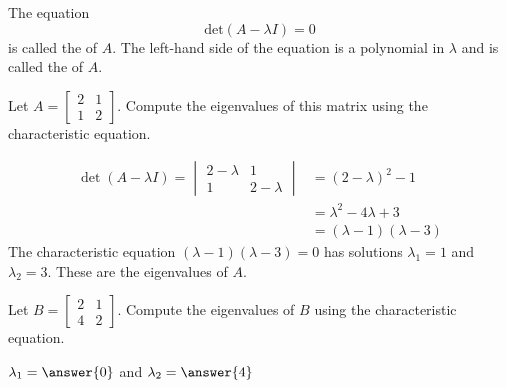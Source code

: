 \documentclass{ximera}
\begin{document}
\begin{definition}\label{def:chareqcharpoly}
The equation 
$$\mbox{det}(A-\lambda I) = 0$$ is called the  of $A$.  The left-hand side of the equation is a polynomial in $\lambda$ and is called the  of $A$.
\end{definition}

\begin{example}\label{ex:2x2eig}
Let $A=\begin{bmatrix} 2& 1\\ 1&2
\end{bmatrix}$.  Compute the eigenvalues of this matrix using the characteristic equation.
\begin{explanation}
\begin{align*}\det(A-\lambda I)=\begin{vmatrix}2-\lambda&1\\1&2-\lambda\end{vmatrix}&=(2-\lambda)^2-1\\
&=\lambda^2-4\lambda+3\\
&=(\lambda-1)(\lambda-3)
\end{align*}
The characteristic equation $(\lambda-1)(\lambda-3)=0$ has solutions $\lambda_1=1$ and $\lambda_2=3$.  These are the eigenvalues of $A$.
\end{explanation}
\end{example}

\begin{example}\label{ex:2x2eig2}
Let $B=\begin{bmatrix} 2& 1\\ 4&2
\end{bmatrix}$.  Compute the eigenvalues of $B$ using the characteristic equation.

$\lambda_1=\answer{0}$ and $\lambda_2=\answer{4}$
\end{example}
\end{document}
